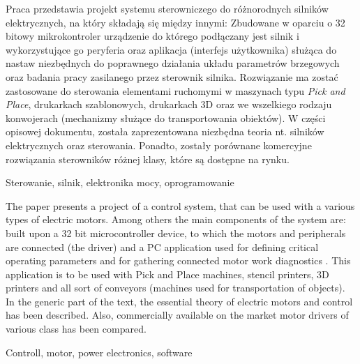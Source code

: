 \thispagestyle{empty}

Praca przedstawia projekt systemu sterowniczego do różnorodnych silników elektrycznych, na który składają się między innymi: Zbudowane w oparciu o 32 bitowy mikrokontroler urządzenie do którego podłączany jest silnik i wykorzystujące go peryferia oraz aplikacja (interfejs użytkownika) służąca do nastaw niezbędnych do poprawnego działania układu parametrów brzegowych oraz badania pracy zasilanego przez sterownik silnika. Rozwiązanie ma zostać zastosowane do sterowania elementami ruchomymi w maszynach typu {\it Pick and Place}, drukarkach szablonowych, drukarkach 3D oraz we wszelkiego rodzaju konwojerach (mechanizmy służące do transportowania obiektów). W części opisowej dokumentu, została zaprezentowana niezbędna teoria nt. silników elektrycznych oraz sterowania. Ponadto, zostały porównane komercyjne rozwiązania sterowników różnej klasy, które są dostępne na rynku.

Sterowanie, silnik, elektronika mocy, oprogramowanie

The paper presents a project of a control system, that can be used with a various types of electric motors. Among others the main components of the system are: built upon a 32 bit microcontroller device, to which the motors and peripherals are connected (the driver) and a PC application used for defining critical operating parameters and for gathering connected motor work diagnostics . This application is to be used with Pick and Place machines, stencil printers, 3D printers and all sort of conveyors (machines used for transportation of objects). In the generic part of the text, the essential theory of electric motors and control has been described. Also, commercially available on the market  motor drivers of various class has been compared.

Controll, motor, power electronics, software


\clearpage
